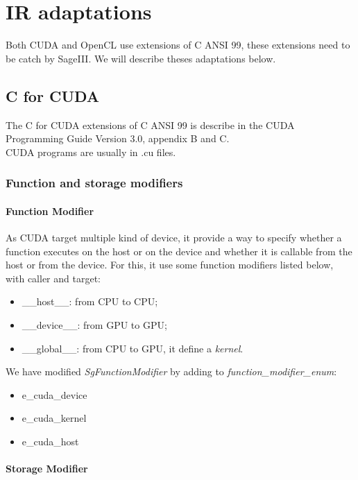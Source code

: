 	\section{IR adaptations}
	
		Both CUDA and OpenCL use extensions of C ANSI 99, these extensions need to be catch by SageIII. We will describe theses adaptations below.

		\subsection{C for CUDA}
		
			The C for CUDA extensions of C ANSI 99 is describe in the CUDA Programming Guide Version 3.0, appendix B and C.\\
			CUDA programs are usually in .cu files.
		
			\subsubsection{Function and storage modifiers}

				\paragraph{Function Modifier}

As CUDA target multiple kind of device, it provide a way to specify whether a function executes on the host or on the device and whether it is
callable from the host or from the device. For this, it use some function modifiers listed below, with caller and target:
\begin{itemize}
	\item \_\_host\_\_: from CPU to CPU;
	\item \_\_device\_\_: from GPU to GPU;
	\item \_\_global\_\_: from CPU to GPU, it define a \emph{kernel}.
\end{itemize}
We have modified \emph{SgFunctionModifier} by adding to \emph{function\_modifier\_enum}:
\begin{itemize}
	\item e\_cuda\_device
	\item e\_cuda\_kernel
	\item e\_cuda\_host
\end{itemize}

				\paragraph{Storage Modifier}	

